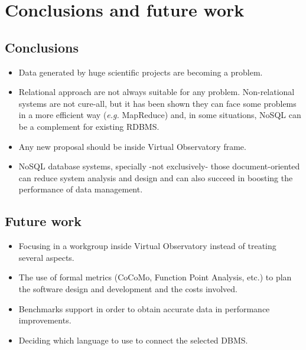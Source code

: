 \chapter{Conclusions and future work}


\section{Conclusions}

\begin{itemize}

\item Data generated by huge scientific projects are becoming a problem.

\item Relational approach are not always suitable for any problem. Non-relational systems are not cure-all, but it has been shown they can face some problems in a more efficient way (\textit{e.g.} MapReduce) and, in some situations, NoSQL can be a complement for existing RDBMS.

\item Any new proposal should be inside Virtual Observatory frame.

\item NoSQL database systems, specially -not exclusively- those document-oriented can reduce system analysis and design and can also succeed in boosting the performance of data management.

\end{itemize}

\section{Future work}

\begin{itemize}

\item Focusing in a workgroup inside Virtual Observatory instead of treating several aspects.

\item The use of formal metrics (CoCoMo, Function Point Analysis, etc.) to plan the software design and development and the costs involved.

\item Benchmarks support in order to obtain accurate data in performance improvements.

\item Deciding which language to use to connect the selected DBMS.


\end{itemize}


